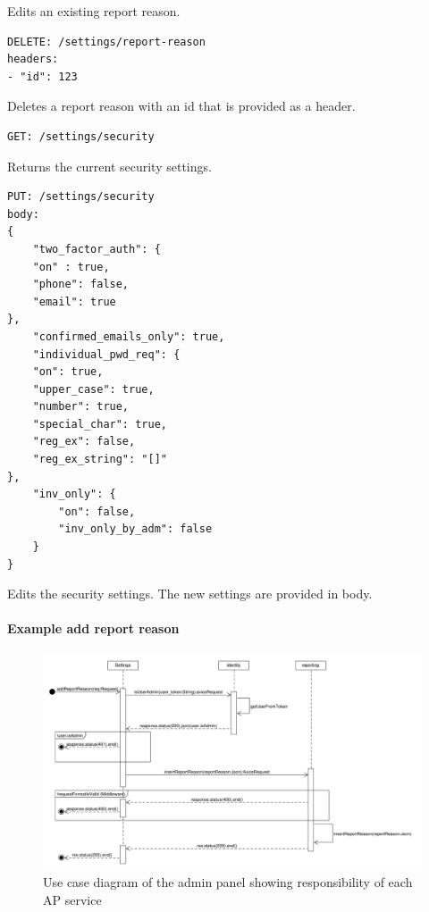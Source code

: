Edits an existing report reason.

\begin{lstlisting}[label={lst:lstlisting4}]
DELETE: /settings/report-reason
headers:
- "id": 123
\end{lstlisting}

Deletes a report reason with an id that is provided as a header.

\begin{lstlisting}[label={lst:lstlisting5}]
GET: /settings/security
\end{lstlisting}

Returns the current security settings.

\begin{lstlisting}[label={lst:lstlisting6}]
PUT: /settings/security
body:
{
    "two_factor_auth": {
    "on" : true,
    "phone": false,
    "email": true
},
    "confirmed_emails_only": true,
    "individual_pwd_req": {
    "on": true,
    "upper_case": true,
    "number": true,
    "special_char": true,
    "reg_ex": false,
    "reg_ex_string": "[]"
},
    "inv_only": {
        "on": false,
        "inv_only_by_adm": false
    }
}
\end{lstlisting}

Edits the security settings.
The new settings are provided in body.

\paragraph{Example add report reason}

\begin{figure}[!ht]
    \centering
    \includegraphics[width=1.0\textwidth]{./images/SequenceDiagram_AddReportReason}
    \caption{Use case diagram of the admin panel showing responsibility of each AP service}
    \label{fig:addReportReason}
\end{figure}

